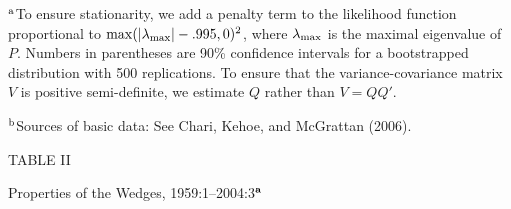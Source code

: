 { \baselineskip 8pt

\item{${}^{\rm a}\!\!$} {\eightpoint 
To ensure stationarity, we add a penalty term to the likelihood 
function proportional to $\max(|\lambda_{\scriptstyle {\rm max}}|-.995,0)^2$, 
where $\lambda_{\scriptstyle {\rm max}}$ is the maximal eigenvalue of $P$.
Numbers in parentheses are 90\% confidence
intervals for a bootstrapped distribution with 500 replications.
To ensure that the variance-covariance matrix $V$ is positive
semi-definite, we estimate $Q$ rather than $V=QQ'$.}

\smallskip
\item {${}^{\rm b}\!\!$} {\eightpoint Sources of basic data: See Chari, Kehoe, and McGrattan
(2006).}


}

\vfill\eject
\centerline{TABLE II}
\medskip
\centerline{\smcaps Properties of the Wedges, 1959:1--2004:3${}^{\bf a}$}
\bigskip

